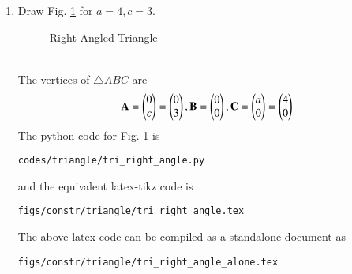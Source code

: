 \renewcommand{\theequation}{\theenumi}
\begin{enumerate}[label=\thesubsection.\arabic*.,ref=\thesubsection.\theenumi]

%
\item Draw Fig. \ref{fig:tri_right_angle} for $a = 4, c =3$.
\label{const:tri_right_angle}
%
\begin{figure}[!ht]
\centering
\resizebox{\columnwidth}{!}{}
\caption{Right Angled Triangle}
\label{fig:tri_right_angle}	
\end{figure}
\\
\solution The vertices of $\triangle ABC$ are 
\begin{align}
\mathbf{A} = \begin{pmatrix}0\\c\end{pmatrix} = \begin{pmatrix}0\\3\end{pmatrix}, \mathbf{B} = \begin{pmatrix}0\\0\end{pmatrix}, \mathbf{C} = \begin{pmatrix}a\\0\end{pmatrix}=\begin{pmatrix}4\\0\end{pmatrix}
\end{align}
%
The python code for  Fig. \ref{fig:tri_right_angle} is
\begin{lstlisting}
codes/triangle/tri_right_angle.py
\end{lstlisting}
%
and the equivalent latex-tikz code is
%
\begin{lstlisting}
figs/constr/triangle/tri_right_angle.tex
\end{lstlisting}
%
The above latex code can be compiled as a standalone document as
%
\begin{lstlisting}
figs/constr/triangle/tri_right_angle_alone.tex
\end{lstlisting}
%


\end{enumerate}
